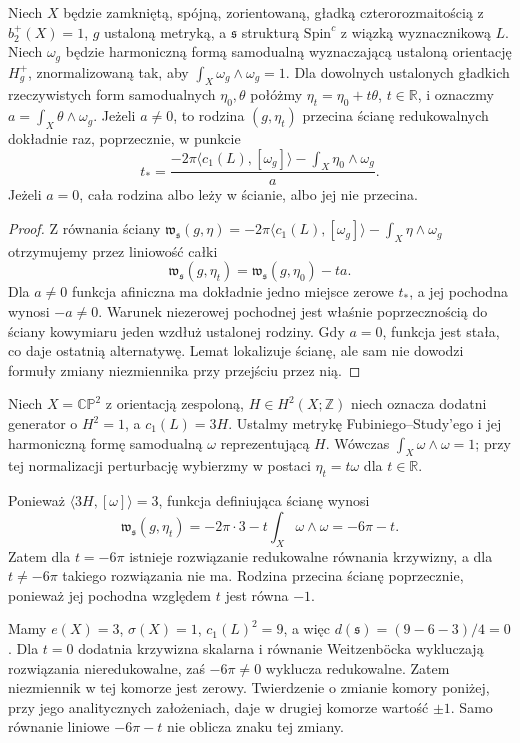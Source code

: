 \begin{lemat}
\label{lem:tg-sw-affine-wall}
Niech $X$ będzie zamkniętą, spójną, zorientowaną,
gładką czterorozmaitością z $b_2^+(X)=1$,
$g$ ustaloną metryką, a $\mathfrak s$
strukturą $\mathrm{Spin}^c$ z wiązką wyznacznikową $L$.
Niech $\omega_g$ będzie harmoniczną formą samodualną
wyznaczającą ustaloną orientację $H_g^+$, znormalizowaną
tak, aby $\int_X\omega_g\wedge\omega_g=1$.
Dla dowolnych ustalonych gładkich rzeczywistych form
samodualnych $\eta_0,\theta$ połóżmy
$\eta_t=\eta_0+t\theta$, $t\in\mathbb R$, i oznaczmy
$a=\int_X\theta\wedge\omega_g$.
Jeżeli $a\ne0$, to rodzina $(g,\eta_t)$ przecina
ścianę redukowalnych dokładnie raz, poprzecznie,
w punkcie
\[
t_*=\frac{-2\pi\langle c_1(L),[\omega_g]\rangle
-\int_X\eta_0\wedge\omega_g}{a}.
\]
Jeżeli $a=0$, cała rodzina albo leży w ścianie,
albo jej nie przecina.
\end{lemat}

\begin{proof}
Z równania ściany
$\mathfrak w_{\mathfrak s}(g,\eta)
=-2\pi\langle c_1(L),[\omega_g]\rangle
-\int_X\eta\wedge\omega_g$
otrzymujemy przez liniowość całki
\[
\mathfrak w_{\mathfrak s}(g,\eta_t)
=\mathfrak w_{\mathfrak s}(g,\eta_0)-ta.
\]
Dla $a\ne0$ funkcja afiniczna ma dokładnie jedno
miejsce zerowe $t_*$, a jej pochodna wynosi $-a\ne0$.
Warunek niezerowej pochodnej jest właśnie
poprzecznością do ściany kowymiaru jeden
wzdłuż ustalonej rodziny. Gdy $a=0$,
funkcja jest stała, co daje ostatnią alternatywę.
Lemat lokalizuje ścianę, ale sam nie dowodzi
formuły zmiany niezmiennika przy przejściu przez nią.
\end{proof}

\begin{przyklad}
\label{ex:tg-sw-wall-cp2}
Niech $X=\mathbb{CP}^2$ z orientacją zespoloną,
$H\in H^2(X;\mathbb Z)$ niech oznacza dodatni
generator o $H^2=1$, a
$c_1(L)=3H$. Ustalmy metrykę Fubiniego--Study'ego
i jej harmoniczną formę samodualną
$\omega$ reprezentującą $H$.
Wówczas $\int_X\omega\wedge\omega=1$;
przy tej normalizacji perturbację
wybierzmy w postaci $\eta_t=t\omega$
dla $t\in\mathbb R$.

Ponieważ $\langle3H,[\omega]\rangle=3$,
funkcja definiująca ścianę wynosi
\[
\mathfrak w_{\mathfrak s}(g,\eta_t)
=-2\pi\cdot3-t\int_X\omega\wedge\omega
=-6\pi-t.
\]
Zatem dla $t=-6\pi$ istnieje rozwiązanie
redukowalne równania krzywizny,
a dla $t\ne-6\pi$ takiego rozwiązania nie ma.
Rodzina przecina ścianę poprzecznie,
ponieważ jej pochodna względem $t$
jest równa $-1$.

Mamy $e(X)=3$, $\sigma(X)=1$,
$c_1(L)^2=9$, a więc
$d(\mathfrak s)=(9-6-3)/4=0$.
Dla $t=0$ dodatnia krzywizna skalarna
i równanie Weitzenböcka wykluczają
rozwiązania nieredukowalne,
zaś $-6\pi\ne0$ wyklucza redukowalne.
Zatem niezmiennik w tej komorze
jest zerowy. Twierdzenie o zmianie komory
poniżej, przy jego analitycznych założeniach,
daje w drugiej komorze wartość $\pm1$.
Samo równanie liniowe $-6\pi-t$
nie oblicza znaku tej zmiany.
\end{przyklad}

